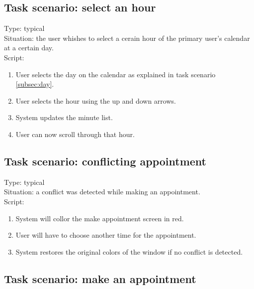 \documentclass[11pt, a4paper,svglistings]{report}
\begin{document}
\subsection{Task scenario: select an hour}

\label{subsec:hour}Type: typical \\
Situation: the user whishes to select a cerain hour  of the primary user's calendar at a certain day. \\
Script:
\begin{enumerate}
\item User selects the day on the calendar as explained in task scenario \ref{subsec:day}.
\item User selects the hour using the up and down arrows.
\item System updates the minute list.
\item User can now scroll through that hour.
\end{enumerate}


\subsection{Task scenario: conflicting appointment}


\label{subsec:conflict}Type: typical \\
Situation: a conflict was detected while making an appointment. \\
Script:
\begin{enumerate}
\item System will collor the make appointment screen in red.
\item User will have to choose another time for the appointment.
\item System restores the original colors of the window if no conflict is detected.
\end{enumerate}


\subsection{Task scenario: make an appointment}
\end{document}
